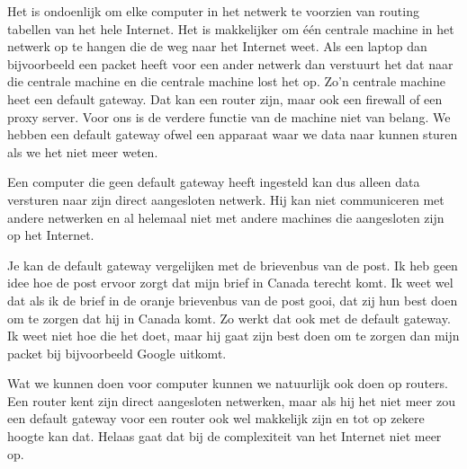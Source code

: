 Het is ondoenlijk om elke computer in het netwerk te voorzien van routing tabellen van het hele Internet. Het is makkelijker om \'e\'en centrale machine in het netwerk op te hangen die de weg naar het Internet weet. Als een laptop dan bijvoorbeeld een packet heeft voor een ander netwerk dan verstuurt het dat naar die centrale machine en die centrale machine lost het op. Zo'n centrale machine heet een default gateway. Dat kan een router zijn, maar ook een firewall of een proxy server. Voor ons is de verdere functie van de machine niet van belang. We hebben een default gateway ofwel een apparaat waar we data naar kunnen sturen als we het niet meer weten.

Een computer die geen default gateway heeft ingesteld kan dus alleen data versturen naar zijn direct aangesloten netwerk. Hij kan niet communiceren met andere netwerken en al helemaal niet met andere machines die aangesloten zijn op het Internet.

Je kan de default gateway vergelijken met de brievenbus van de post. Ik heb geen idee hoe de post ervoor zorgt dat mijn brief in Canada terecht komt. Ik weet wel dat als ik de brief in de oranje brievenbus van de post gooi, dat zij hun best doen om te zorgen dat hij in Canada komt. Zo werkt dat ook met de default gateway. Ik weet niet hoe die het doet, maar hij gaat zijn best doen om te zorgen dan mijn packet bij bijvoorbeeld Google uitkomt.

Wat we kunnen doen voor computer kunnen we natuurlijk ook doen op routers. Een router kent zijn direct aangesloten netwerken, maar als hij het niet meer zou een default gateway voor een router ook wel makkelijk zijn en tot op zekere hoogte kan dat. Helaas gaat dat bij de complexiteit van het Internet niet meer op.
